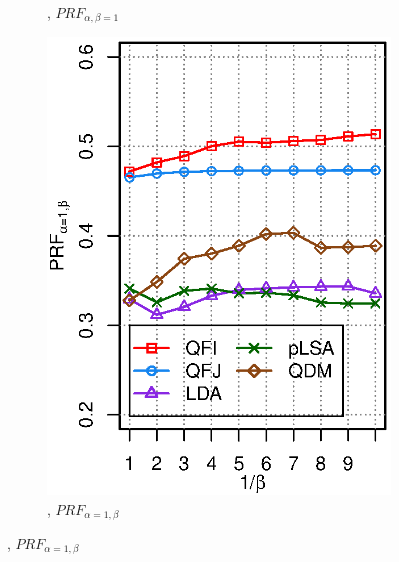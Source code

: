 \begin{figure}[ht!]
\begin{subfigure}[b]{0.45\columnwidth}
\caption{\DQF, $P\!R\!F_{\alpha,\beta=1}$}
\end{subfigure}
\begin{subfigure}[b]{0.45\columnwidth}
\includegraphics[width=\columnwidth]{figure/qf13-prfaf-5models.eps}
\caption{\DQF, $P\!R\!F_{\alpha=1,\beta}$}
\end{subfigure}
\end{figure}

